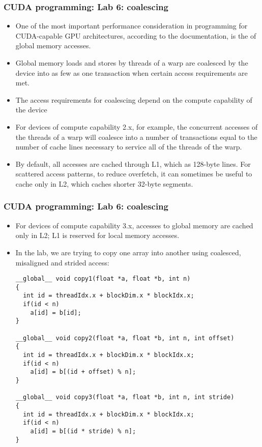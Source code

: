 \begin{frame}[fragile]
  \frametitle{CUDA programming: Lab 6: coalescing}
\begin{itemize}
\item One of the most important performance consideration in programming for
  CUDA-capable GPU architectures, according to the documentation, is the  of global memory accesses. 
\item Global memory loads and stores by threads of a warp are coalesced by the device into as few as
  one transaction when certain access requirements are met.
\item The access requirements for coalescing depend on the compute capability of the device
\item For devices of compute capability 2.x, for example, the concurrent accesses of the threads of a warp will coalesce into a number of
  transactions equal to the number of cache lines necessary to service all of the threads
  of the warp.
\item By default, all accesses are cached through L1, which as 128-byte lines. For
  scattered access patterns, to reduce overfetch, it can sometimes be useful to cache only in
  L2, which caches shorter 32-byte segments.
\end{itemize}
\end{frame}

\begin{frame}[fragile]
  \frametitle{CUDA programming: Lab 6: coalescing}
\begin{itemize}
\item For devices of compute capability 3.x, accesses to global memory are cached only in L2;
  L1 is reserved for local memory accesses.
\item In the lab, we are trying to copy one array into another using coalesced, misaligned and strided access:
{\tiny
{\color{mycolorcode}
\begin{verbatim}
__global__ void copy1(float *a, float *b, int n)
{
  int id = threadIdx.x + blockDim.x * blockIdx.x;
  if(id < n)
    a[id] = b[id];
}

__global__ void copy2(float *a, float *b, int n, int offset)
{
  int id = threadIdx.x + blockDim.x * blockIdx.x;
  if(id < n)
    a[id] = b[(id + offset) % n];
}

__global__ void copy3(float *a, float *b, int n, int stride)
{
  int id = threadIdx.x + blockDim.x * blockIdx.x;
  if(id < n)
    a[id] = b[(id * stride) % n];
}
\end{verbatim}
}
}
\end{itemize}
\end{frame}



